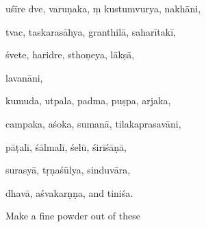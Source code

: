 \begin{translation}
\gls{uśīre dve},  
\gls{varuṇaka}, ṃ 
\gls{kustumvurya},  
\gls{nakhāni},  


\gls{tvac},  
\gls{taskarasāhya},  
\gls{granthilā},  
\gls{saharītakī}, 


\gls{śvete},  
\gls{haridre}, 
\gls{ sthoṇeya},  
\gls{lākṣā},   

\gls{lavanāni}, 


\gls{kumuda},  
\gls{utpala},  
\gls{padma},  
\gls{puṣpa},  
\gls{arjaka}, 


\gls{campaka},  
\gls{aśoka},  
\gls{sumanā},  
\gls{tilakaprasavāni}, 


\gls{pāṭalī},  
\gls{śālmalī},  
\gls{śelū},  
\gls{śirīśāṇā},  


\gls{surasyā},  
\gls{tṛṇaśūlya},  
\gls{sinduvāra}, 


\gls{dhavā},  
\gls{aśvakarṇṇa},  and 
\gls{tiniśa}.

Make a fine powder out of these


\end{translation}
